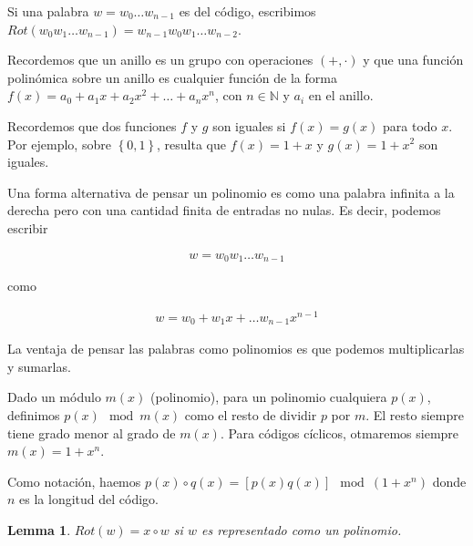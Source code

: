 \documentclass[a4paper]{article}
\newtheorem{lemma}{Lemma}
\newtheorem{lemma}{Lemma}
\begin{document}
Si una palabra $w = w_0 \ldots w_{n-1}$ es del código, escribimos $Rot(w_0 w_1
\ldots w_{n-1}) = w_{n-1}w_0 w_1 \ldots w_{n-2}$.

Recordemos que un anillo es un grupo con operaciones $(+, \cdot)$ y que una
función polinómica sobre un anillo es cualquier función de la forma $f(x) = a_0
+ a_1x + a_2x^2 + \ldots + a_nx^n$, con $n \in \mathbb{N}$ y $a_i$ en el
anillo.

Recordemos que dos funciones $f$ y $g$ son iguales si $f(x) = g(x)$ para todo $x$.
Por ejemplo, sobre $\left\{ 0, 1 \right\} $, resulta que $f(x) = 1 + x$ y $g(x) = 1 + x^2$
son iguales.

Una forma alternativa de pensar un polinomio es como una palabra infinita a la derecha 
pero con una cantidad finita de entradas no nulas. Es decir, podemos escribir 

\begin{align*}
    w = w_0 w_1 \ldots w_{n - 1}
\end{align*}

como 

\begin{align*}
    w = w_0 + w_1x + \ldots w_{n-1}x^{n-1}
\end{align*}

La ventaja de pensar las palabras como polinomios es que podemos multiplicarlas 
y sumarlas.

Dado un módulo $m(x)$ (polinomio), para un polinomio cualquiera $p(x)$,
definimos $p(x) \mod m(x)$ como el resto de dividir $p$ por $m$. El resto 
siempre tiene grado menor al grado de $m(x)$. Para códigos cíclicos,
otmaremos siempre $m(x) = 1 + x^n$.

Como notación, haemos $p(x) \circ q(x) = \left[ p(x) q(x) \right] \mod (1 + x^n)$
donde $n$ es la longitud del código.

\begin{lemma}
    $Rot(w) = x \circ w$ si $w$ es representado como un polinomio.
\end{lemma}
\end{document}
